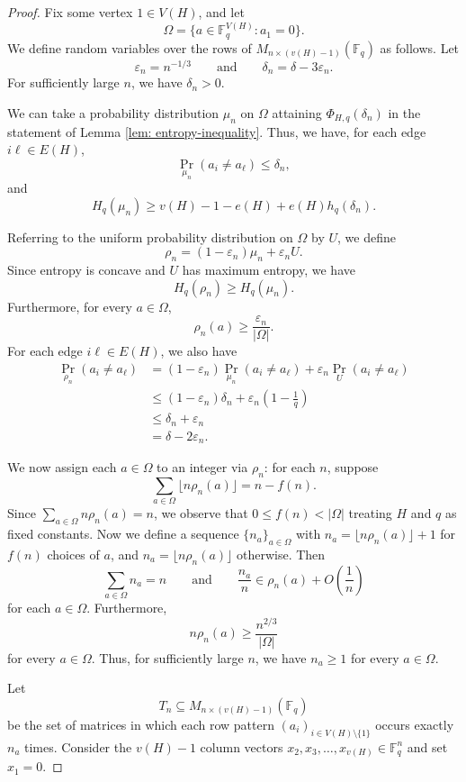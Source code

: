 \documentclass[12pt]{article}
\newcommand{\Fq}{\mathbb{F}_q}
\begin{document}
\begin{proof}
Fix some vertex $1\in V(H)$, and let
\[
\Omega=\{a\in\Fq^{V(H)}:a_1=0\}.
\]
We define random variables over the rows of
$M_{n\times(v(H)-1)}(\Fq)$ as follows. Let
\[
\varepsilon_n=n^{-1/3}
\qquad\text{and}\qquad
\delta_n=\delta-3\varepsilon_n.
\]
For sufficiently large $n$, we have $\delta_n>0$. 

We can take a probability distribution $\mu_n$ on $\Omega$ attaining $\Phi_{H,q}(\delta_n)$ in the statement of Lemma \ref{lem: entropy-inequality}. Thus, we have, for each
edge $i\ell\in E(H)$,
\[
\Pr_{\mu_n}(a_i\neq a_\ell)\leq\delta_n,
\]
and
\[
H_q(\mu_n)\geq
v(H)-1-e(H)+e(H)h_q(\delta_n).
\]

\noindent Referring to the uniform probability distribution on $\Omega$ by $U$, we
define
\[
\rho_n=(1-\varepsilon_n)\mu_n+\varepsilon_nU.
\]
Since entropy is concave and $U$ has maximum entropy, we have
\[
H_q(\rho_n)\geq H_q(\mu_n).
\]
Furthermore, for every $a\in\Omega$,
\[
\rho_n(a)\geq\frac{\varepsilon_n}{|\Omega|}.
\]
For each edge $i\ell\in E(H)$, we also have
\begin{align*}
\Pr_{\rho_n}(a_i\neq a_\ell)
&=(1-\varepsilon_n)\Pr_{\mu_n}(a_i\neq a_\ell)
+\varepsilon_n\Pr_U(a_i\neq a_\ell)\\
&\leq(1-\varepsilon_n)\delta_n
+\varepsilon_n\left(1-\frac1q\right)\\
&\leq\delta_n+\varepsilon_n\\
&=\delta-2\varepsilon_n.
\end{align*}

\noindent We now assign each $a\in\Omega$ to an integer via $\rho_n$: for each $n$, suppose
\[
\sum_{a\in\Omega}\lfloor n\rho_n(a)\rfloor=n-f(n).
\]
Since $\sum_{a\in\Omega}n\rho_n(a)=n$, we observe that $0\leq f(n)<|\Omega|$ treating $H$ and $q$ as fixed constants. Now we define a sequence $\{n_a\}_{a\in\Omega}$ with $n_a=\lfloor n\rho_n(a)\rfloor+1$ for $f(n)$ choices of $a$, and $n_a=\lfloor n\rho_n(a)\rfloor$ otherwise. Then
\[
\sum_{a\in\Omega}n_a=n
\qquad\text{and}\qquad
\frac{n_a}{n}\in\rho_n(a)+O\left(\frac1n\right)
\]
for each $a\in\Omega$. Furthermore,
\[
n\rho_n(a)\geq\frac{n^{2/3}}{|\Omega|}
\]
for every $a\in\Omega$. Thus, for sufficiently large $n$, we have $n_a\geq1$ for every $a\in\Omega$.

\noindent  Let
\[
T_n\subseteq M_{n\times(v(H)-1)}(\Fq)
\]
be the set of matrices in which each row pattern $(a_i)_{i\in V(H)\setminus\{1\}}$ occurs exactly $n_a$ times. Consider the $v(H)-1$ column vectors $x_2,x_3,\dots,x_{v(H)}\in\Fq^n$ and set $x_1=0$.


\end{proof}
\end{document}
